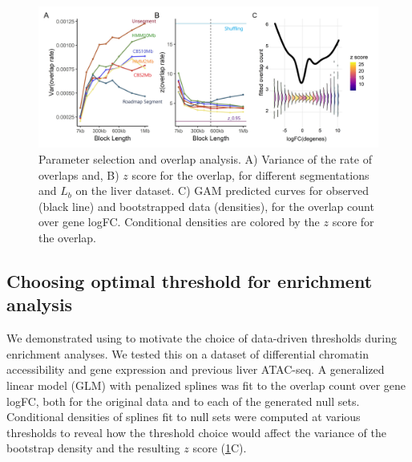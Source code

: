 \begin{figure}[H]
\centering%
\setlength{\abovecaptionskip}{-0.1cm}
\setlength{\belowcaptionskip}{-0.1cm}
\includegraphics[scale=0.06]{Figures/fig2_3.jpeg}
\caption{
  Parameter selection and overlap analysis.
  A) Variance of the rate of overlaps and,
  B) $z$ score for the overlap,
  for different segmentations and $L_b$ on the liver 
  dataset.
  C) GAM predicted curves for observed (black line) and
  bootstrapped data (densities),
  for the overlap count over gene logFC.
  Conditional densities are colored by the $z$ score for the overlap.
}
\label{fig:result}
\vspace{-.5cm}
\end{figure}


\subsection{Choosing optimal threshold for enrichment analysis}
We demonstrated using \bootranges to motivate the choice of data-driven thresholds 
during enrichment analyses. We tested this on a dataset of differential chromatin accessibility and gene expression 
\citep{alasoo2018shared,lee2020fluent} and previous liver ATAC-seq.
A generalized linear model (GLM) with penalized splines was
fit to the overlap count over gene logFC, both for the original
data and to each of the generated null sets.
Conditional densities of splines fit to null sets
were computed at various thresholds to reveal how
the threshold choice would affect the
variance of the bootstrap density and the resulting $z$ score
(\cref{fig:result}C). 



